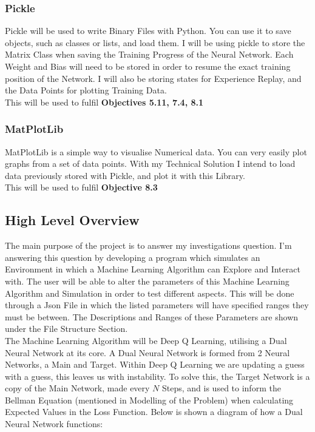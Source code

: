 \begin{flushleft}
            \subsubsection*{Pickle}
            Pickle will be used to write Binary Files with Python. You can use it to save objects, such as classes
            or lists, and load them. I will be using pickle to store the Matrix Class when saving the Training Progress of
            the Neural Network. Each Weight and Bias will need to be stored in order to resume the exact training position of the
            Network. I will also be storing states for Experience Replay, and the Data Points for plotting Training Data. \\
            \vspace{0.2cm}
            This will be used to fulfil \textbf{Objectives 5.11, 7.4, 8.1} \\

            \subsubsection*{MatPlotLib}
            MatPlotLib is a simple way to visualise Numerical data. You can very easily plot graphs from a set of
            data points. With my Technical Solution I intend to load data previously stored with Pickle, and plot it with this Library. \\
            \vspace{0.2cm} 
            This will be used to fulfil \textbf{Objective 8.3} \\
        \subsection{High Level Overview}
            \large
            The main purpose of the project is to answer my investigations question. I'm answering this question by developing 
            a program which simulates an Environment in which a Machine Learning Algorithm can Explore and Interact with. The user
            will be able to alter the parameters of this Machine Learning Algorithm and Simulation in order to test different aspects. 
            This will be done through a Json File in which the listed parameters will have specified ranges they must be between. The
            Descriptions and Ranges of these Parameters are shown under the File Structure Section. \\
            \vspace{0.2cm}
            The Machine Learning Algorithm will be Deep Q Learning, utilising a Dual Neural Network at its core. A Dual Neural Network
            is formed from 2 Neural Networks, a Main and Target. Within Deep Q Learning we are updating a guess with a guess,
            this leaves us with instability. To solve this, the Target Network is a copy of the Main Network, made every $N$ Steps, and is used to 
            inform the Bellman Equation (mentioned in Modelling of the Problem) when calculating Expected Values in the Loss Function. 
            Below is shown a diagram of how a Dual Neural Network functions: \\
            

\end{flushleft}
